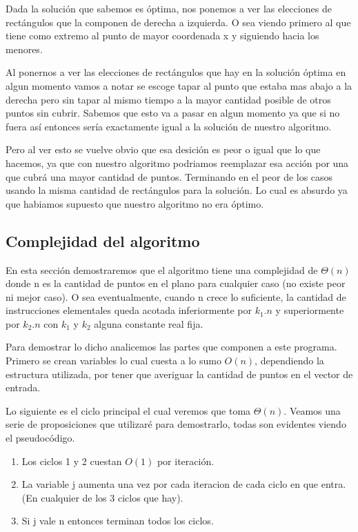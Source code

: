 Dada la solución que sabemos es óptima, nos ponemos a ver las elecciones de rectángulos que la componen de derecha a izquierda. O sea viendo primero al que tiene como extremo al punto de mayor coordenada x y siguiendo hacia los menores.

Al ponernos a ver las elecciones de rectángulos que hay en la solución óptima en algun momento vamos a notar se escoge tapar al punto que estaba mas abajo a la derecha pero sin tapar al mismo tiempo a la mayor cantidad posible de otros puntos sin cubrir. Sabemos que esto va a pasar en algun momento ya que si no fuera así entonces sería exactamente igual a la solución de nuestro algoritmo.

Pero al ver esto se vuelve obvio que esa desición es peor o igual que lo que hacemos, ya que con nuestro algoritmo podriamos reemplazar esa acción por una que cubrá una mayor cantidad de puntos. Terminando en el peor de los casos usando la misma cantidad de rectángulos para la solución. Lo cual es absurdo ya que habiamos supuesto que nuestro algoritmo no era óptimo.

\subsection{Complejidad del algoritmo}

En esta sección demostraremos que el algoritmo tiene una complejidad de $\Theta(n)$ donde n es la cantidad de puntos en el plano para cualquier caso (no existe peor ni mejor caso). O sea eventualmente, cuando n crece lo suficiente, la cantidad de instrucciones elementales queda acotada inferiormente por $k_1.n$ y superiormente por $k_2.n$ con $k_1$ y $k_2$ alguna constante real fija.

Para demostrar lo dicho analicemos las partes que componen a este programa. Primero se crean variables lo cual cuesta a lo sumo $O(n)$, dependiendo la estructura utilizada, por tener que averiguar la cantidad de puntos en el vector de entrada.

Lo siguiente es el ciclo principal el cual veremos que toma $\Theta(n)$. Veamos una serie de proposiciones que utilizaré para demostrarlo, todas son evidentes viendo el pseudocódigo.

\begin{enumerate}

\item Los ciclos 1 y 2 cuestan $O(1)$ por iteración.

\item La variable j aumenta una vez por cada iteracion de cada ciclo en que entra. (En cualquier de los 3 ciclos que hay).

\item Si j vale n entonces terminan todos los ciclos.

\end{enumerate}

